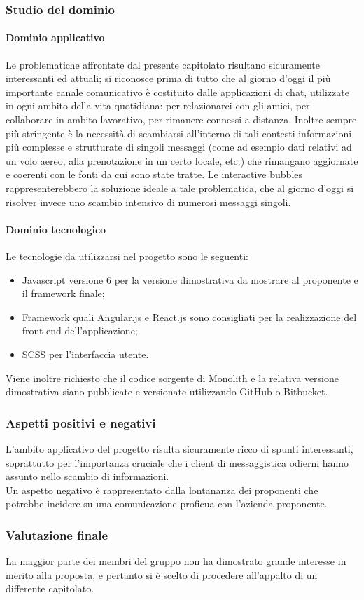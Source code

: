 		\subsubsection{Studio del dominio}
			\paragraph{Dominio applicativo}
			Le problematiche affrontate dal presente capitolato risultano sicuramente interessanti ed attuali; si riconosce prima di tutto che al 
			giorno d'oggi il più importante canale comunicativo è costituito dalle applicazioni di chat, utilizzate in ogni ambito della vita 
			quotidiana: per relazionarci con gli amici, per collaborare in ambito lavorativo, per rimanere connessi a distanza. Inoltre sempre 
			più stringente è la necessità di scambiarsi all'interno di tali contesti informazioni più complesse e strutturate di singoli messaggi 
			(come ad esempio dati relativi ad un volo aereo, alla prenotazione in un certo locale, etc.) che rimangano aggiornate e coerenti con 
			le fonti da cui sono state tratte. Le interactive bubbles rappresenterebbero la soluzione ideale a tale problematica, che al giorno 
			d'oggi si risolver invece uno scambio intensivo di numerosi messaggi singoli. 
			\paragraph{Dominio tecnologico}
			Le tecnologie da utilizzarsi nel progetto sono le seguenti:
			\begin{itemize}
				\item Javascript versione 6 per la versione dimostrativa da mostrare al proponente e il framework finale;
				\item Framework quali Angular.js e React.js sono consigliati per la realizzazione del front-end dell'applicazione;
				\item SCSS per l'interfaccia utente.
			\end{itemize}
			Viene inoltre richiesto che il codice sorgente di Monolith e la relativa versione dimostrativa siano pubblicate e versionate utilizzando 
			GitHub o Bitbucket.
		\subsubsection{Aspetti positivi e negativi}
		L'ambito applicativo del progetto risulta sicuramente ricco di spunti interessanti, soprattutto per l'importanza cruciale che i client di 
		messaggistica odierni hanno assunto nello scambio di informazioni.
		\\Un aspetto negativo è rappresentato dalla lontananza dei proponenti che potrebbe incidere su una comunicazione proficua con l'azienda 
		proponente.
		\subsubsection{Valutazione finale}
		La maggior parte dei membri del gruppo non ha dimostrato grande interesse in merito alla proposta, e pertanto si è scelto di procedere 
		all'appalto di un differente capitolato.

